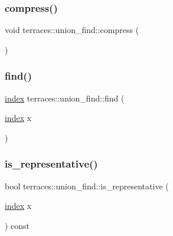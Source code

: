 \subsubsection{\texorpdfstring{compress()}{compress()}}
{\footnotesize\ttfamily void terraces\+::union\+\_\+find\+::compress (\begin{DoxyParamCaption}{ }\end{DoxyParamCaption})}

\mbox{\label{classterraces_1_1union__find_a2517df18689c278dc41f14395cd36f5e}} 
\subsubsection{\texorpdfstring{find()}{find()}}
{\footnotesize\ttfamily \hyperlink{namespaceterraces_adbc33ccb543d1634e96d0eb02e472c77}{index} terraces\+::union\+\_\+find\+::find (\begin{DoxyParamCaption}\item[{\hyperlink{namespaceterraces_adbc33ccb543d1634e96d0eb02e472c77}{index}}]{x }\end{DoxyParamCaption})}

\mbox{\label{classterraces_1_1union__find_a6659180419525421c0d4ff6c7e48fc47}} 
\subsubsection{\texorpdfstring{is\+\_\+representative()}{is\_representative()}}
{\footnotesize\ttfamily bool terraces\+::union\+\_\+find\+::is\+\_\+representative (\begin{DoxyParamCaption}\item[{\hyperlink{namespaceterraces_adbc33ccb543d1634e96d0eb02e472c77}{index}}]{x }\end{DoxyParamCaption}) const\hspace{0.3cm}{\ttfamily [inline]}}

\mbox{\label{classterraces_1_1union__find_a27e4ea548412d40c25904739d21e41ca}} 
